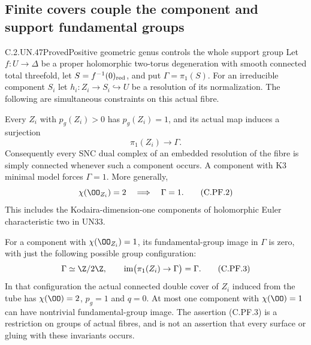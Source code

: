 \subsection{Finite covers couple the component and support fundamental groups}

\begin{statement}{C.2.UN.47}{Proved}{Positive geometric genus controls the whole support group}
Let $f:U\to\Delta$ be a proper holomorphic two-torus degeneration
with smooth connected total threefold, let $S=f^{-1}(0)_{\rm red}$,
and put $\Gamma=\pi_1(S)$. For an irreducible component $S_i$ let
$h_i:Z_i\to S_i\hookrightarrow U$ be a resolution of its normalization.
The following are simultaneous constraints on this actual fibre.

Every $Z_i$ with $p_g(Z_i)>0$ has $p_g(Z_i)=1$, and its actual
map induces a surjection
\[
                         \pi_1(Z_i)\longrightarrow\Gamma .
                                                        \tag{C.PF.1}
\]
Consequently every SNC dual complex of an embedded resolution of
the fibre is simply connected whenever such a component occurs.
A component with K3 minimal model forces $\Gamma=1$.
More generally,
\[
                    \chi(\OO_{Z_i})=2
                         \quad\Longrightarrow\quad\Gamma=1 .
                                                        \tag{C.PF.2}
\]
This includes the Kodaira-dimension-one components of holomorphic
Euler characteristic two in UN33.

For a component with $\chi(\OO_{Z_i})=1$, its fundamental-group
image in $\Gamma$ is zero, with just the following possible
group configuration:
\[
 \Gamma\simeq\Z/2\Z,\qquad
 \operatorname{im}\bigl(\pi_1(Z_i)\to\Gamma\bigr)=\Gamma .
                                                        \tag{C.PF.3}
\]
In that configuration the actual connected double cover of $Z_i$
induced from the tube has
$\chi(\OO)=2$, $p_g=1$ and $q=0$. At most one component with
$\chi(\OO)=1$ can have nontrivial fundamental-group image.
The assertion (C.PF.3) is a restriction on groups of actual fibres,
and is not an assertion that every surface or gluing with these
invariants occurs.
\end{statement}

